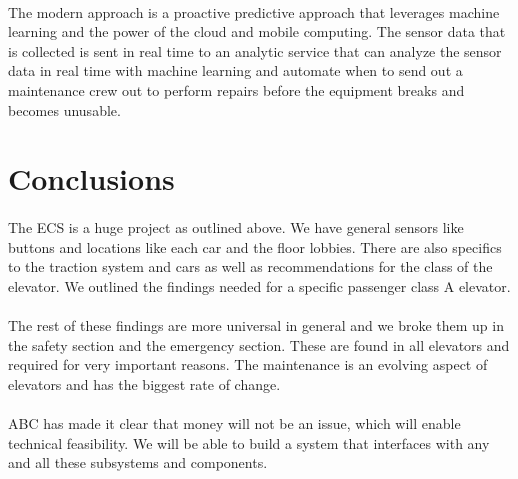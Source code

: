 \documentclass[12pt]{article}
\begin{document}
\paragraph{} The modern approach is a proactive predictive approach that leverages machine learning and the power of the cloud and mobile computing. The sensor data that is collected is sent in real time to an analytic service that can analyze the sensor data in real time with machine learning and automate when to send out a maintenance crew out to perform repairs before the equipment breaks and becomes unusable.
\section{Conclusions}
\paragraph{} The ECS is a huge project as outlined above. We have general sensors like buttons and locations like each car and the floor lobbies. There are also specifics to the traction system and cars as well as recommendations for the class of the elevator. We outlined the findings needed for a specific passenger class A elevator.
\paragraph{} The rest of these findings are more universal in general and we broke them up in the safety section and the emergency section. These are found in all elevators and required for very important reasons. The maintenance is an evolving aspect of elevators and has the biggest rate of change.
\paragraph{} ABC has made it clear that money will not be an issue, which will enable technical feasibility. We will be able to build a system that interfaces with any and all these subsystems and components.
\end{document}
